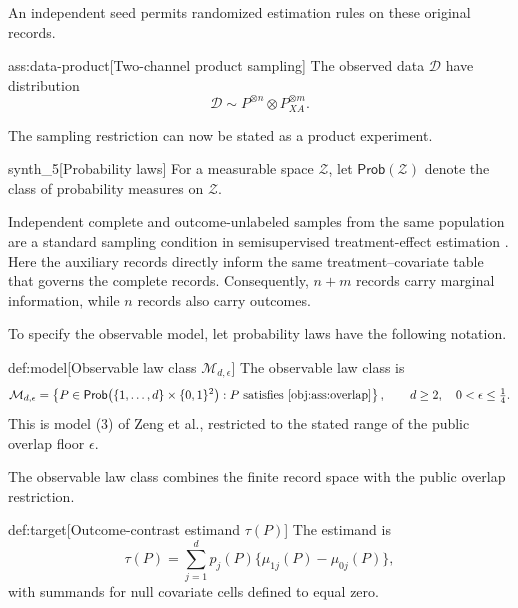 \documentclass[11pt]{article}
\begin{document}
An independent seed  permits randomized estimation rules on these original records.

\begin{assumptionv}{ass:data-product}[Two-channel product sampling]
The observed data \(\mathcal D\) have distribution
\[
\mathcal D\sim P^{\otimes n}\otimes P_{XA}^{\otimes m}.
\]
\end{assumptionv}

The sampling restriction can now be stated as a product experiment.

\begin{definitionv}{synth_5}[Probability laws]
For a measurable space \(\mathcal Z\), let \(\mathsf{Prob}(\mathcal Z)\) denote the class of probability measures on \(\mathcal Z\).
\end{definitionv}

Independent complete and outcome-unlabeled samples from the same population are a standard sampling condition in semisupervised treatment-effect estimation \citep[Assumptions 2.1--2.2]{ChakraborttyDai2024Semisupervised}. Here the auxiliary records directly inform the same treatment--covariate table that governs the complete records. Consequently, \(n+m\) records carry marginal information, while \(n\) records also carry outcomes.

To specify the observable model, let probability laws have the following notation.

\begin{definitionv}{def:model}[Observable law class \(\mathcal M_{d,\epsilon}\)]
The observable law class is
\[
\mathcal M_{d,\epsilon}
=
\left\{
P\in\mathsf{Prob}\bigl(\{1,\ldots,d\}\times\{0,1\}^2\bigr):
P\text{ satisfies }\cref{obj:ass:overlap}
\right\},
\qquad d\ge2,\quad 0<\epsilon\le\tfrac14.
\]
This is model (3) of Zeng et al., restricted to the stated range of the public overlap floor \(\epsilon\).
\end{definitionv}

The observable law class  combines the finite record space with the public overlap restriction.

\begin{definitionv}{def:target}[Outcome-contrast estimand \(\tau(P)\)]
The estimand is
\[
\tau(P)
=
\sum_{j=1}^{d}p_j(P)\{\mu_{1j}(P)-\mu_{0j}(P)\},
\]
with summands for null covariate cells defined to equal zero.
\end{definitionv}
\end{document}
